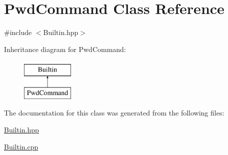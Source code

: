 \hypertarget{classPwdCommand}{
\section{PwdCommand Class Reference}
\label{classPwdCommand}
}


{\ttfamily \#include $<$Builtin.hpp$>$}

Inheritance diagram for PwdCommand:\begin{figure}[H]
\begin{center}
\leavevmode
\includegraphics[height=2.000000cm]{classPwdCommand}
\end{center}
\end{figure}


The documentation for this class was generated from the following files:\begin{DoxyCompactItemize}
\item 
\hyperlink{Builtin_8hpp}{Builtin.hpp}\item 
\hyperlink{Builtin_8cpp}{Builtin.cpp}\end{DoxyCompactItemize}

